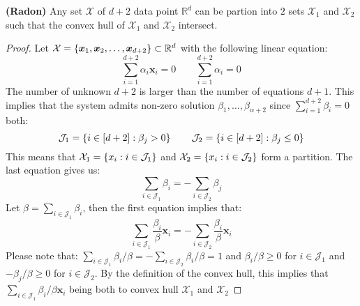 \begin{theorem}{\textbf{(Radon)}}
    Any set $\mathcal{X}$ of $d+2$ data point $\mathbb{R}^d$ can be partion into $2$ sets $\mathcal{X}_1$ and $\mathcal{X}_2$ such that the convex hull of $\mathcal{X}_1$ and $\mathcal{X}_2$ intersect.
\end{theorem}
\begin{proof}
    Let $\mathcal{X} = \left\{ \boldsymbol x_1, \boldsymbol x_2, \dots, \boldsymbol x_{d+2} \right\} \subset \mathbb{R}^d$ with the following linear equation:
    \begin{equation*}
        \sum^{d+2}_{i=1}\alpha_i\boldsymbol x_i = 0 \qquad \sum^{d+2}_{i=1} \alpha_i = 0
    \end{equation*}
    The number of unknown $d+2$ is larger than the number of equations $d+1$. This implies that the system admits non-zero solution $\beta_1,\dots,\beta_{\alpha+2}$ since $\sum^{d+2}_{i=1} \beta_i = 0 $ both:
    \begin{equation*}
        \mathcal{J}_1 = \left\{ i \in [d+2] : \beta_j > 0 \right\} \qquad \mathcal{J}_2 = \left\{ i \in [d+2] : \beta_j \le 0 \right\} 
    \end{equation*} 
    This means that $\mathcal{X}_1 = \left\{ x_i : i \in \mathcal{J}_1 \right\}$ and $\mathcal{X}_2 = \left\{ x_i : i \in \mathcal{J}_2 \right\}$ form a partition. The last equation gives us:
    \begin{equation*}
        \sum_{i\in\mathcal{J}_1}\beta_i = -\sum_{i\in\mathcal{J}_2}\beta_j
    \end{equation*}
    Let $\beta=\sum_{i\in\mathcal{J}_1}\beta_i$, then the first equation implies that:
    \begin{equation*}
        \sum_{i\in\mathcal{J}_1} \frac{\beta_i}{\beta}\boldsymbol x_i = -\sum_{i\in\mathcal{J}_2}\frac{\beta_i}{\beta}\boldsymbol x_i
    \end{equation*}
    Please note that: $\sum_{i\in\mathcal{J}_1} \beta_i/\beta = -\sum_{i\in\mathcal{J}_2}\beta_i/\beta = 1$ and $\beta_i/\beta\ge0$ for $i \in\mathcal{J}_1$ and $-\beta_j/\beta \ge 0$ for $i \in \mathcal{J}_2$. By the definition of the convex hull, this implies that $\sum_{i\in\mathcal{J}_1}\beta_i/\beta\boldsymbol x_i$ being both to convex hull $\mathcal{X}_1$ and $\mathcal{X}_2$
\end{proof}

